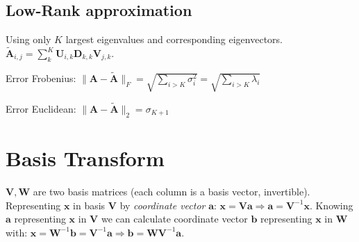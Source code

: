 \documentclass[a4paper, 11pt, landscape]{article}
\begin{document}
\begin{multicols*}{3}
\subsection{Low-Rank approximation}
Using only $K$ largest eigenvalues and corresponding eigenvectors. $\tilde{\mathbf{A}}_{i, j} = \sum_{k}^K \mathbf{U}_{i, k} \mathbf{D}_{k,k} \mathbf{V}_{j, k}$.
\begin{compactdesc}
	\item[Error Frobenius:] $\|\mathbf{A} - \tilde{\mathbf{A}}\|_F = \sqrt{\sum_{i > K} \sigma_i^2} = \sqrt{\sum_{i > K} \lambda_i}$
	\item[Error Euclidean:] $\|\mathbf{A} - \tilde{\mathbf{A}}\|_2 = \sigma_{K+1}$
\end{compactdesc}

\section{Basis Transform}
$\mathbf{V}, \mathbf{W}$ are two basis matrices (each column is a basis vector, invertible). Representing $\mathbf{x}$ in basis $\mathbf{V}$ by \emph{coordinate vector} $\mathbf{a}$: $\mathbf{x} = \mathbf{V} \mathbf{a} \Rightarrow \mathbf{a} = \mathbf{V}^{-1} \mathbf{x}$. Knowing $\mathbf{a}$ representing $\mathbf{x}$ in $\mathbf{V}$ we can calculate coordinate vector $\mathbf{b}$ representing $\mathbf{x}$ in $\mathbf{W}$ with: $\mathbf{x} = \mathbf{W}^{-1} \mathbf{b} = \mathbf{V}^{-1} \mathbf{a} \Rightarrow \mathbf{b} = \mathbf{W} \mathbf{V}^{-1} \mathbf{a}$.


\end{multicols*}
\end{document}
